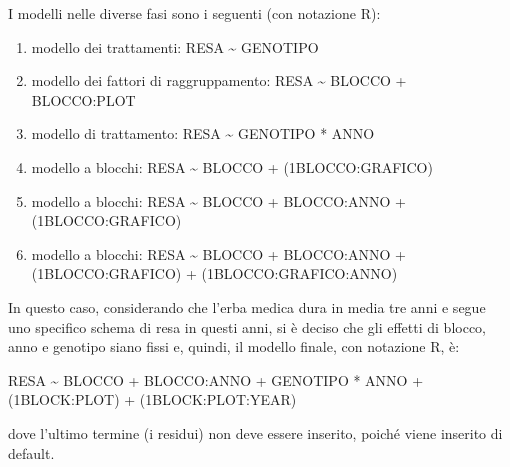 \documentclass[
  12pt,
]{book}
\providecommand{\tightlist}{%
  \setlength{\itemsep}{0pt}\setlength{\parskip}{0pt}}
\begin{document}
I modelli nelle diverse fasi sono i seguenti (con notazione R):

\begin{enumerate}
\def\labelenumi{\arabic{enumi}.}
\tightlist
\item
  modello dei trattamenti: RESA \textasciitilde{} GENOTIPO
\item
  modello dei fattori di raggruppamento: RESA \textasciitilde{} BLOCCO + BLOCCO:PLOT
\item
  modello di trattamento: RESA \textasciitilde{} GENOTIPO * ANNO
\item
  modello a blocchi: RESA \textasciitilde{} BLOCCO + (1\textbar BLOCCO:GRAFICO)
\item
  modello a blocchi: RESA \textasciitilde{} BLOCCO + BLOCCO:ANNO + (1\textbar BLOCCO:GRAFICO)
\item
  modello a blocchi: RESA \textasciitilde{} BLOCCO + BLOCCO:ANNO + (1\textbar BLOCCO:GRAFICO) + (1\textbar BLOCCO:GRAFICO:ANNO)
\end{enumerate}

In questo caso, considerando che l'erba medica dura in media tre anni e segue uno specifico schema di resa in questi anni, si è deciso che gli effetti di blocco, anno e genotipo siano fissi e, quindi, il modello finale, con notazione R, è:

RESA \textasciitilde{} BLOCCO + BLOCCO:ANNO + GENOTIPO * ANNO + (1\textbar BLOCK:PLOT) + (1\textbar BLOCK:PLOT:YEAR)

dove l'ultimo termine (i residui) non deve essere inserito, poiché viene inserito di default.
\end{document}
